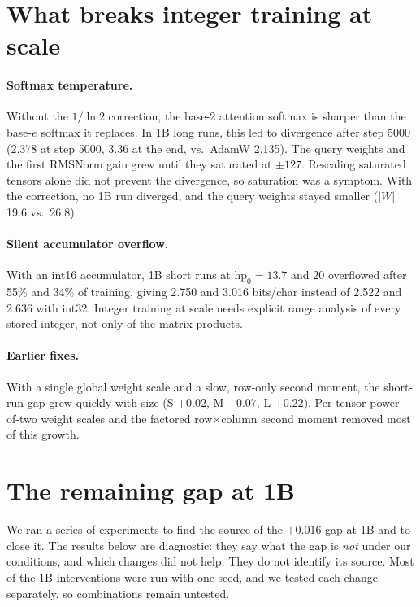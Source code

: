 \documentclass[11pt]{article}
\begin{document}
\section{What breaks integer training at scale}\label{sec:breaks}
\paragraph{Softmax temperature.} Without the $1/\ln 2$ correction, the base-2 attention softmax is sharper than the base-$e$ softmax it replaces. In 1B long runs, this led to divergence after step 5000 (2.378 at step 5000, 3.36 at the end, vs.\ AdamW 2.135). The query weights and the first RMSNorm gain grew until they saturated at $\pm127$. Rescaling saturated tensors alone did not prevent the divergence, so saturation was a symptom. With the correction, no 1B run diverged, and the query weights stayed smaller ($|W|$ 19.6 vs.\ 26.8).

\paragraph{Silent accumulator overflow.} With an int16 accumulator, 1B short runs at $\mathrm{hp}_0=13.7$ and $20$ overflowed after 55\% and 34\% of training, giving 2.750 and 3.016 bits/char instead of 2.522 and 2.636 with int32. Integer training at scale needs explicit range analysis of every stored integer, not only of the matrix products.

\paragraph{Earlier fixes.} With a single global weight scale and a slow, row-only second moment, the short-run gap grew quickly with size (S $+0.02$, M $+0.07$, L $+0.22$). Per-tensor power-of-two weight scales and the factored row$\times$column second moment removed most of this growth.

\section{The remaining gap at 1B}\label{sec:gap}
We ran a series of experiments to find the source of the $+0.016$ gap at 1B and to close it. The results below are diagnostic: they say what the gap is \emph{not} under our conditions, and which changes did not help. They do not identify its source. Most of the 1B interventions were run with one seed, and we tested each change separately, so combinations remain untested.
\end{document}
